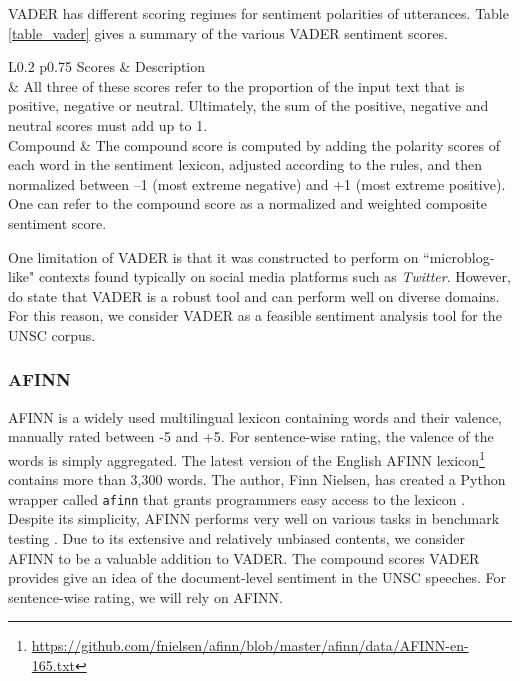 VADER has different scoring regimes for sentiment polarities of utterances. Table \ref{table_vader} gives a summary of the various VADER sentiment scores.

\begin{table}[H]
	\centering
	\small
	\setlength{\tabcolsep}{0.5em}
	\def\arraystretch{1.1}
	\begin{threeparttable}
		\begin{tabular}{L{0.2\linewidth} p{0.75\linewidth}}
			\toprule[0.25mm]
			Scores & Description \\
			\midrule[0.35mm]
			  & All three of these scores refer to the proportion of the input text that is positive, negative or neutral. Ultimately, the sum of the positive, negative and neutral scores must add up to 1. \\[35pt]
			Compound  & The compound score is computed by adding the polarity scores of each word in the sentiment lexicon, adjusted according to the rules, and then normalized between --1 (most extreme negative) and +1 (most extreme positive). One can refer to the compound score as a normalized and weighted composite sentiment score.\\[20pt]
			\bottomrule[0.25mm]
		\end{tabular}
		\caption{Tabular summary of VADER sentiment scores}
		\label{table_vader}
	\end{threeparttable}
\end{table}

One limitation of VADER is that it was constructed to perform on ``microblog-like" contexts found typically on social media platforms such as \textit{Twitter}. However, \citet{vader} do state that VADER is a robust tool and can perform well on diverse domains. For this reason, we consider VADER as a feasible sentiment analysis tool for the UNSC corpus.

\subsubsection{AFINN}
AFINN is a widely used multilingual lexicon containing words and their valence, manually rated between -5 and +5. For sentence-wise rating, the valence of the words is simply aggregated. The latest version of the English AFINN lexicon\footnote{\href{https://github.com/fnielsen/afinn/blob/master/afinn/data/AFINN-en-165.txt}{https://github.com/fnielsen/afinn/blob/master/afinn/data/AFINN-en-165.txt}} contains more than 3,300 words.
The author, Finn Nielsen, has created a Python wrapper called \texttt{afinn} that grants programmers easy access to the lexicon \citep{afinn}.
Despite its simplicity, AFINN performs very well on various tasks in benchmark testing \citep{sentibench}. 
Due to its extensive and relatively unbiased contents, we consider AFINN to be a valuable addition to VADER. The compound scores VADER provides give an idea of the document-level sentiment in the UNSC speeches. For sentence-wise rating, we will rely on AFINN.

